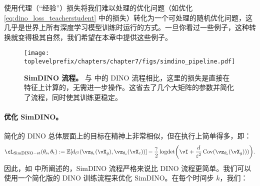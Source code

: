 \documentclass[../../book-main.tex]{subfiles}
\begin{document}
使用代理（“经验”）损失将我们难以处理的优化问题（如优化 \eqref{eq:dino_loss_teacherstudent} 中的损失）转化为一个可处理的随机优化问题，这几乎是世界上所有深度学习模型训练时运行的方式。一旦你看过一些例子，这种转换就变得极其自然，我们希望在本章中提供这些例子。

\begin{figure}
    \centering 
    \texttt{[image: \\toplevelprefix/chapters/chapter7/figs/simdino\_pipeline.pdf]}
    \caption{\small\textbf{SimDINO 流程。} 与  中的 DINO 流程相比，这里的损失是直接在特征上计算的，无需进一步操作。这省去了几个大矩阵的参数并简化了流程，同时使其训练更稳定。}\label{fig:simdino_pipeline}
\end{figure}

\paragraph{优化 SimDINO。} 简化的 DINO 总体层面上的目标在精神上非常相似，但在执行上简单得多，即：
\begin{equation}\label{eq:simdino_loss_teacherstudent}
    \cL_{\simdino-\student\teacher}(\theta_{\student}, \theta_{\teacher}) :=  \Ex\rs{d_{\ell^{2}}(\vz_{\theta_{\teacher}}(\vX_{g}), \vz_{\theta_{\student}}(\vX_{c}))} - \frac{\gamma}{2}\logdet\rp{\vI + \frac{d}{\eps^{2}}\Cov(\vz_{\theta_{\student}}(\vX_{g})))}.
\end{equation}
因此，如  中所阐述的，SimDINO 流程严格来说比 DINO 流程更简单。我们可以使用一个简化版的 DINO 训练流程来优化 SimDINO。在每个时间步 \(k\)，我们：
\end{document}
